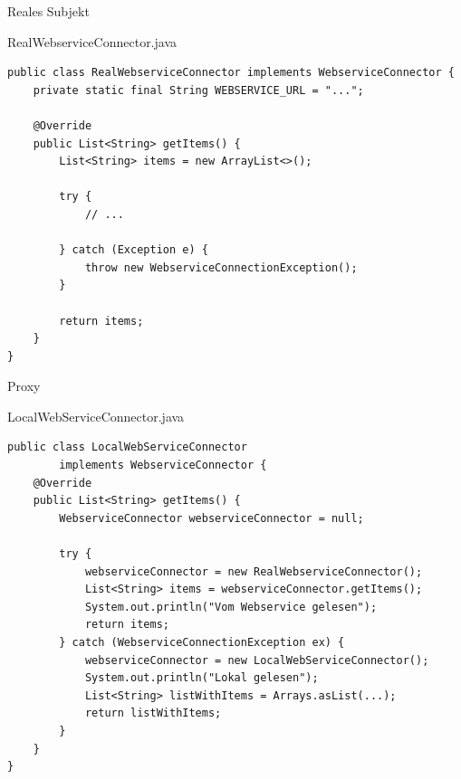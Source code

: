 \begin{frame}[fragile]{Reales Subjekt}
	\begin{exampleblock}{RealWebserviceConnector.java}
        \begin{lstlisting}
public class RealWebserviceConnector implements WebserviceConnector {
	private static final String WEBSERVICE_URL = "...";
	
	@Override
	public List<String> getItems() {
		List<String> items = new ArrayList<>();
		
		try {
            // ...

        } catch (Exception e) {
            throw new WebserviceConnectionException();
        }
		
		return items;
	}
}
        \end{lstlisting}
 	\end{exampleblock}
\end{frame}

\begin{frame}[fragile]{Proxy}
	\begin{exampleblock}{LocalWebServiceConnector.java}
        \begin{lstlisting}
public class LocalWebServiceConnector 
        implements WebserviceConnector {
	@Override
	public List<String> getItems() {
		WebserviceConnector webserviceConnector = null;
		
		try {
			webserviceConnector = new RealWebserviceConnector();
			List<String> items = webserviceConnector.getItems();
			System.out.println("Vom Webservice gelesen");
			return items;
		} catch (WebserviceConnectionException ex) {
			webserviceConnector = new LocalWebServiceConnector();
			System.out.println("Lokal gelesen");
			List<String> listWithItems = Arrays.asList(...);
			return listWithItems;
		}
	}
}
        \end{lstlisting}
 	\end{exampleblock}
\end{frame}
